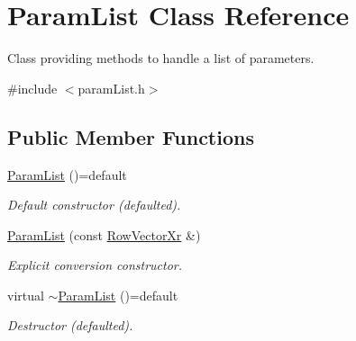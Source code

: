 \hypertarget{classParamList}{\section{Param\-List Class Reference}
\label{classParamList}
}


Class providing methods to handle a list of parameters.  




{\ttfamily \#include $<$param\-List.\-h$>$}

\subsection*{Public Member Functions}
\begin{DoxyCompactItemize}
\item 
\hypertarget{classParamList_a9e4b0ea6081bb500861f231f0b4f7900}{\hyperlink{classParamList_a9e4b0ea6081bb500861f231f0b4f7900}{Param\-List} ()=default}\label{classParamList_a9e4b0ea6081bb500861f231f0b4f7900}

\begin{DoxyCompactList}\small\item\em Default constructor (defaulted). \end{DoxyCompactList}\item 
\hyperlink{classParamList_ab10ecc4f7c5e6b2f26bfaebd48f10549}{Param\-List} (const \hyperlink{typedefs_8h_aaf38a491cc6d8aeb1c1f53f380789bad}{Row\-Vector\-Xr} \&)
\begin{DoxyCompactList}\small\item\em Explicit conversion constructor. \end{DoxyCompactList}\item 
\hypertarget{classParamList_a454ef9f83c9777b5c33cf273d88b3e5d}{virtual \hyperlink{classParamList_a454ef9f83c9777b5c33cf273d88b3e5d}{$\sim$\-Param\-List} ()=default}\label{classParamList_a454ef9f83c9777b5c33cf273d88b3e5d}

\begin{DoxyCompactList}\small\item\em Destructor (defaulted). \end{DoxyCompactList}\end{DoxyCompactItemize}
